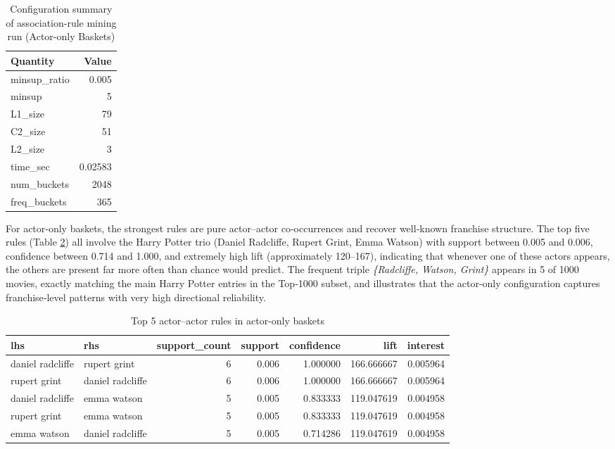 \documentclass{article}  %
\begin{document}
\begin{table}[!htbp]
    \caption{Configuration summary of association-rule mining run (Actor-only Baskets)}
    \centering
    \begin{tabular}{l r}
        \toprule
        \textbf{Quantity} & \textbf{Value} \\
        \midrule
        minsup\_ratio   & 0.005 \\
        minsup          & 5 \\
        L1\_size        & 79 \\
        C2\_size        & 51 \\
        L2\_size        & 3 \\
        time\_sec       & 0.02583 \\
        num\_buckets    & 2048 \\
        freq\_buckets   & 365 \\
        \bottomrule
    \end{tabular}
    \label{tab:19config_summary}
\end{table}

For actor‑only baskets, the strongest rules are pure actor–actor co‑occurrences and recover well‑known franchise structure. The top five rules (Table \ref{tab:20actor_only_rules}) all involve the Harry Potter trio (Daniel Radcliffe, Rupert Grint, Emma Watson) with support between 0.005 and 0.006, confidence between 0.714 and 1.000, and extremely high lift (approximately 120–167), indicating that whenever one of these actors appears, the others are present far more often than chance would predict. The frequent triple \textit{\{Radcliffe, Watson, Grint\}} appears in 5 of 1000 movies, exactly matching the main Harry Potter entries in the Top‑1000 subset, and illustrates that the actor‑only configuration captures franchise‑level patterns with very high directional reliability. 
\begin{table}[!htbp]
    \caption{Top 5 actor--actor rules in actor-only baskets}
    \centering
    \begin{tabular}{l l r r r r r}
        \toprule
        \textbf{lhs} & \textbf{rhs} &
        \textbf{support\_count} & \textbf{support} &
        \textbf{confidence} & \textbf{lift} &
        \textbf{interest} \\
        \midrule
        daniel radcliffe & rupert grint &
        6 & 0.006 & 1.000000 & 166.666667 & 0.005964 \\
        rupert grint & daniel radcliffe &
        6 & 0.006 & 1.000000 & 166.666667 & 0.005964 \\
        daniel radcliffe & emma watson &
        5 & 0.005 & 0.833333 & 119.047619 & 0.004958 \\
        rupert grint & emma watson &
        5 & 0.005 & 0.833333 & 119.047619 & 0.004958 \\
        emma watson & daniel radcliffe &
        5 & 0.005 & 0.714286 & 119.047619 & 0.004958 \\
    \end{tabular}
    \label{tab:20actor_only_rules}
\end{table}
\end{document}
